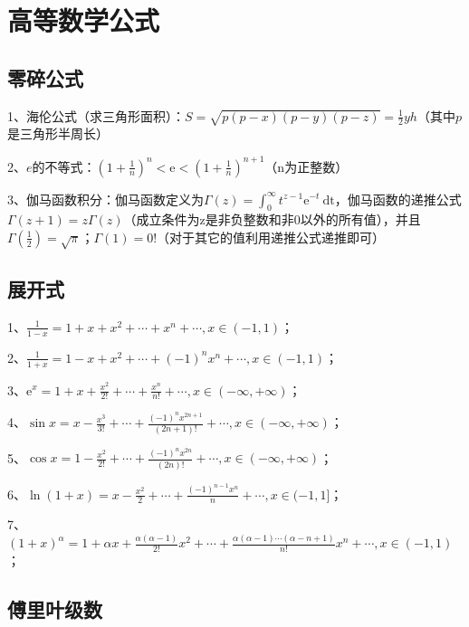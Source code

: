 \chapter{高等数学公式}

\section{零碎公式}

1、海伦公式（求三角形面积）：$S=\sqrt{p(p-x)(p-y)(p-z)}=\frac{1}{2} y h$（其中$p$是三角形半周长）

2、$e$的不等式：$\left(1+\frac{1}{n}\right)^{n}<\mathrm{e}<\left(1+\frac{1}{n}\right)^{n+1}$（n为正整数）

3、伽马函数积分：伽马函数定义为$\Gamma(z)=\int_{0}^{\infty} t^{z-1} \mathrm{e}^{-t} \mathrm{~d} \mathrm{t}$，伽马函数的递推公式$\Gamma(z+1)=z \Gamma(z)$（成立条件为z是非负整数和非0以外的所有值），并且$\Gamma\left(\frac{1}{2}\right) =\sqrt{\pi}$；$\Gamma(1) =0 !$（对于其它的值利用递推公式递推即可）

\section{展开式}

1、$\frac{1}{1-x}=1+x+x^{2}+\cdots+x^{n}+\cdots, x \in(-1,1)$；

2、$\frac{1}{1+x}=1-x+x^{2}+\cdots+(-1)^{n} x^{n}+\cdots, x \in(-1,1)$；

3、$\mathrm{e}^{x}=1+x+\frac{x^{2}}{2 !}+\cdots+\frac{x^{n}}{n !}+\cdots, x \in(-\infty,+\infty)$；

4、$\sin x=x-\frac{x^{3}}{3 !}+\cdots+\frac{(-1)^{n} x^{2 n+1}}{(2 n+1) !}+\cdots, x \in(-\infty,+\infty)$；

5、$\cos x=1-\frac{x^{2}}{2 !}+\cdots+\frac{(-1)^{n} x^{2 n}}{(2 n) !}+\cdots, x \in(-\infty,+\infty)$；

6、$\ln (1+x)=x-\frac{x^{2}}{2}+\cdots+\frac{(-1)^{n-1} x^{n}}{n}+\cdots, x \in(-1,1]$；

7、$(1+x)^{\alpha}=1+\alpha x+\frac{\alpha(\alpha-1)}{2 !} x^{2}+\cdots+\frac{\alpha(\alpha-1) \cdots(\alpha-n+1)}{n !} x^{n}+\cdots, x \in(-1,1)$；

\section{傅里叶级数}



